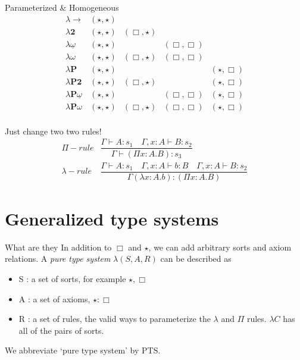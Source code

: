 \documentclass{beamer}
\begin{document}
    \begin{frame}{Parameterized \& Homogeneous}
        \[\begin{array}{l|cccc}
            \lambda\rightarrow & (\star, \star)\\
            \lambda \textbf{2} & (\star, \star) & (\Box, \star) \\
            \lambda \underline\omega & (\star, \star) && (\Box, \Box) \\
            \lambda \omega& (\star, \star) & (\Box, \star) & (\Box, \Box) \\
            \lambda\textbf{P} & (\star, \star) &&& (\star, \Box)\\
            \lambda \textbf{P2} & (\star, \star) & (\Box, \star)&& (\star, \Box) \\
            \lambda \textbf{P}\underline\omega & (\star, \star) && (\Box, \Box)& (\star, \Box) \\
            \lambda \textbf{P}\omega& (\star, \star) & (\Box, \star) & (\Box, \Box)&(\star, \Box) \\
        \end{array}\]
    \end{frame}

    \begin{frame}{Just change two two rules!}
        \[\begin{array}{lc}
            \Pi{-}rule & \dfrac{\Gamma \vdash A : s_1\quad \Gamma, x : A \vdash B : s_2}{\Gamma \vdash (\Pi x : A . B) : s_3} \\[1cm]
            \lambda{-}rule &\dfrac{\Gamma \vdash A : s_1\quad \Gamma, x : A \vdash b : B\quad \Gamma, x : A \vdash B : s_2}{\Gamma (\lambda x: A .b) : (\Pi x : A . B)}
        \end{array}\]
    \end{frame}

    \section{Generalized type systems}

    \begin{frame}{What are they}
        In addition to $\Box$ and $\star$, we can add arbitrary sorts and axiom relations. A \textit{pure type system} $\lambda(S, A, R)$ can be described as 
        \begin{itemize}
            \item<1-> S : a set of sorts, for example $\star, \Box$
                \pause
            \item<2-> A : a set of axioms, $\star : \Box$
                \pause
            \item<3-> R : a set of rules, the valid ways to parameterize the $\lambda$ and $\Pi$ rules. $\lambda C$ has all of the pairs of sorts.
        \end{itemize}
        \pause
        We abbreviate `pure type system' by PTS.
    \end{frame}
\end{document}
